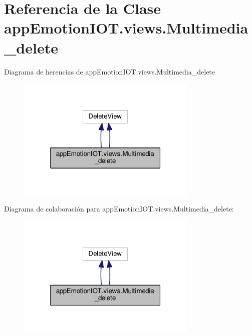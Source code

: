 \hypertarget{classappEmotionIOT_1_1views_1_1Multimedia__delete}{}\section{Referencia de la Clase app\+Emotion\+I\+O\+T.\+views.\+Multimedia\+\_\+delete}
\label{classappEmotionIOT_1_1views_1_1Multimedia__delete}


Diagrama de herencias de app\+Emotion\+I\+O\+T.\+views.\+Multimedia\+\_\+delete
\nopagebreak
\begin{figure}[H]
\begin{center}
\leavevmode
\includegraphics[width=244pt]{classappEmotionIOT_1_1views_1_1Multimedia__delete__inherit__graph}
\end{center}
\end{figure}


Diagrama de colaboración para app\+Emotion\+I\+O\+T.\+views.\+Multimedia\+\_\+delete\+:
\nopagebreak
\begin{figure}[H]
\begin{center}
\leavevmode
\includegraphics[width=244pt]{classappEmotionIOT_1_1views_1_1Multimedia__delete__coll__graph}
\end{center}
\end{figure}
